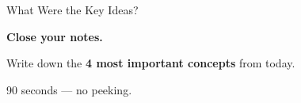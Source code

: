\documentclass[aspectratio=169, 12pt]{beamer}
\begin{document}
\begin{frame}{What Were the Key Ideas?}
\note{
%
%
}

\centering
\vspace{1.5cm}
{\Large\bfseries Close your notes.}

\vspace{0.8cm}
{\large Write down the \textbf{4 most important concepts} from today.}

\vspace{0.8cm}
{\normalsize\textcolor{midgray}{90 seconds --- no peeking.}}

\end{frame}
\end{document}
